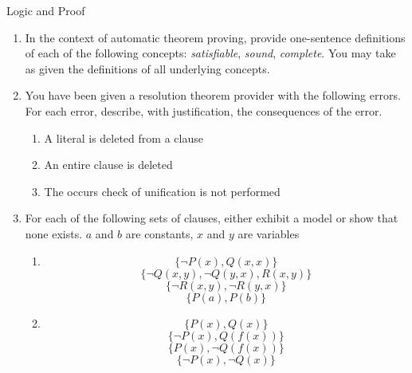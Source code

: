 \documentclass{tripos}  %
\begin{document}
\begin{question}[MockIB,year=2024,paper=1,question=12,author=rrw]{Logic and Proof}


  \begin{enumerate}
  \item In the context of automatic theorem proving, provide one-sentence definitions of each of the following concepts: {\em satisfiable}, {\em sound}, {\em complete}. You may take as given the definitions of all underlying concepts. 
  \item You have been given a resolution theorem provider with the following errors. For each error, describe, with justification, the consequences of the error.
    \begin{enumerate}
    \item A literal is deleted from a clause 
    \item An entire clause is deleted 
    \item The occurs check of unification is not performed 
    \end{enumerate}
  \item For each of the following sets of clauses, either exhibit a model or show that none exists. $a$ and $b$ are constants, $x$ and $y$ are variables
    \begin{enumerate}
    \item
      \[
      \{ \neg P(x), Q(x,x) \}
      \]
      \[
      \{ \neg Q(x,y), \neg Q(y,x), R(x,y) \}
      \]
      \[
      \{ \neg R(x,y), \neg R(y,x) \}
      \]
      \[
      \{ P(a), P(b) \}
      \] 
    \item
      \[
      \{ P(x), Q(x) \}
      \]
      \[
      \{ \neg P(x), Q(f(x)) \}
      \]
      \[
      \{ P(x), \neg Q(f(x)) \}
      \]
      \[
      \{ \neg P(x), \neg Q(x) \}
      \] 
    \end{enumerate}
   
    \end{enumerate}

  
\end{question}
\end{document}
